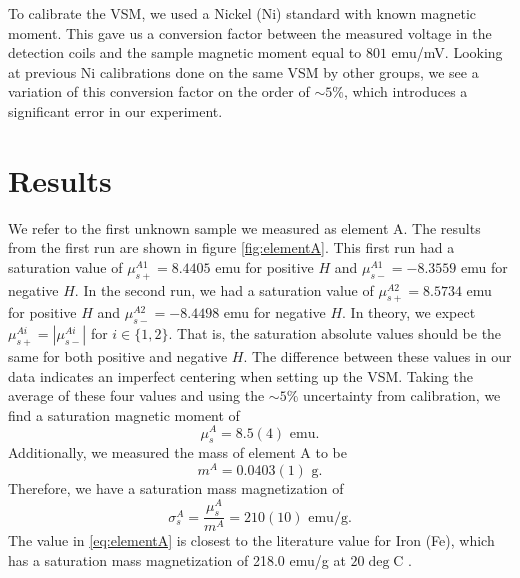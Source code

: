 \documentclass{../paper}
\begin{document}
To calibrate the VSM, we used a Nickel (Ni) standard with known magnetic moment. This gave us a conversion factor between the measured voltage in the detection coils and the sample magnetic moment equal to $801$ emu/mV. Looking at previous Ni calibrations done on the same VSM by other groups, we see a variation of this conversion factor on the order of $\sim 5\%$, which introduces a significant error in our experiment.

\section{Results}\label{sec:results}

We refer to the first unknown sample we measured as element A. The results from the first run are shown in figure \ref{fig:elementA}. This first run had a saturation value of $\mu^{A1}_{s+} = 8.4405$ emu for positive $H$ and $\mu^{A1}_{s-} = -8.3559$ emu for negative $H$. In the second run, we had a saturation value of $\mu^{A2}_{s+} = 8.5734$ emu for positive $H$ and $\mu^{A2}_{s-} = -8.4498$ emu for negative $H$. In theory, we expect $\mu^{Ai}_{s+} = |\mu^{Ai}_{s-}|$ for $i \in \{1,2\}$. That is, the saturation absolute values should be the same for both positive and negative $H$. The difference between these values in our data indicates an imperfect centering when setting up the VSM. Taking the average of these four values and using the $\sim 5\%$ uncertainty from calibration, we find a saturation magnetic moment of
\begin{equation}
  \mu_s^A = 8.5(4) \text{ emu}.
\end{equation}
Additionally, we measured the mass of element A to be
\begin{equation}
  m^A = 0.0403(1) \text{ g}.
\end{equation}
Therefore, we have a saturation mass magnetization of
\begin{equation}\label{eq:elementA}
  \sigma_s^A = \frac{\mu_s^A}{m^A} = 210(10) \text{ emu/g}.
\end{equation}
The value in \eqref{eq:elementA} is closest to the literature value for Iron (Fe), which has a saturation mass magnetization of 218.0 emu/g at $20\deg$C \cite{CRCHandbook}.
\end{document}
